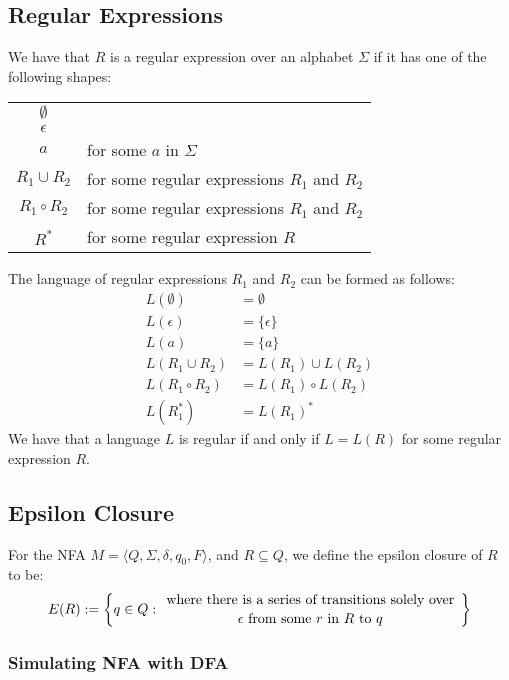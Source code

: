 \subsection{Regular Expressions}

We have that $R$ is a regular expression over an alphabet
$\Sigma$ if it has one of the following shapes:
\begin{center}
    \begin{tabular}{ c l }
        $\emptyset$ & \\
        $\epsilon$ & \\
        $a$ & for some $a$ in $\Sigma$ \\
        $R_1 \cup R_2$ & for some regular expressions $R_1$ and $R_2$ \\
        $R_1 \circ R_2$ & for some regular expressions $R_1$ and $R_2$ \\
        $R^*$ & for some regular expression $R$ \\
    \end{tabular}
\end{center} The language of regular expressions $R_1$ and $R_2$
can be formed as follows: \begin{align*}
    L(\emptyset) &= \emptyset \\
    L(\epsilon) &= \{\epsilon\} \\
    L(a) &= \{a\} \\
    L(R_1 \cup R_2) &= L(R_1) \cup L(R_2) \\
    L(R_1 \circ R_2) &= L(R_1) \circ L(R_2) \\
    L(R_1^*) &= L(R_1)^*
\end{align*} We have that a language $L$ is regular
if and only if $L = L(R)$ for some regular expression $R$.

\subsection{Epsilon Closure}

For the NFA $M =  \langle Q, \Sigma, \delta, q_0, F \rangle$, 
and $R \subseteq Q$, we define the epsilon closure
of $R$ to be: \begin{gather*}
    E(R) := \left\{
        q \in Q : \bfrac{
        \text{ where there is a series of 
        transitions solely over }
    }{
        \epsilon \text{ from some } r \text{ in } 
        R \text{ to } q
    }\right\}
\end{gather*}

\subsubsection{Simulating NFA with DFA}

